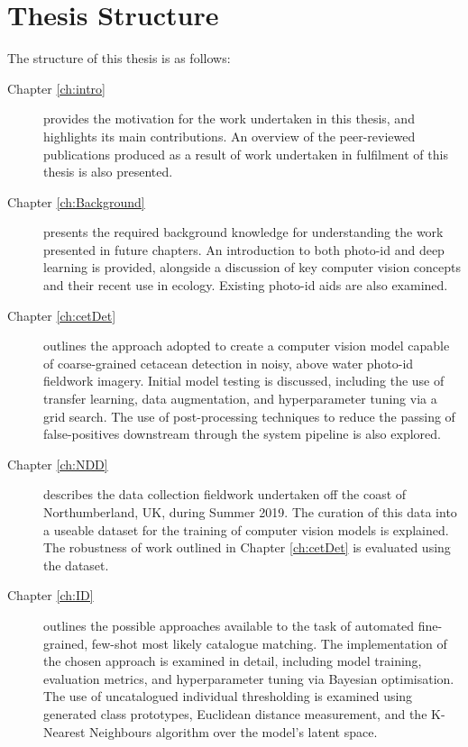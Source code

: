 \section{Thesis Structure}\label{ch:intro,sec:Structure}

The structure of this thesis is as follows:

\begin{description}
	\item[Chapter \ref{ch:intro}] provides the motivation for the work undertaken in this thesis, and highlights its main contributions. An overview of the peer-reviewed publications produced as a result of work undertaken in fulfilment of this thesis is also presented.
	
	\item[Chapter \ref{ch:Background}] presents the required background knowledge for understanding the work presented in future chapters. An introduction to both photo-id and deep learning is provided, alongside a discussion of key computer vision concepts and their recent use in ecology. Existing photo-id aids are also examined.
	
	\item[Chapter \ref{ch:cetDet}] outlines the approach adopted to create a computer vision model capable of coarse-grained cetacean detection in noisy, above water photo-id fieldwork imagery. Initial model testing is discussed, including the use of transfer learning, data augmentation, and hyperparameter tuning via a grid search. The use of post-processing techniques to reduce the passing of false-positives downstream through the system pipeline is also explored. 
	
	\item[Chapter \ref{ch:NDD}] describes the data collection fieldwork undertaken off the coast of Northumberland, UK, during Summer 2019. The curation of this data into a useable dataset for the training of computer vision models is explained. The robustness of work outlined in Chapter \ref{ch:cetDet} is evaluated using the dataset. 
	
	\item[Chapter \ref{ch:ID}] outlines the possible approaches available to the task of automated fine-grained, few-shot most likely catalogue matching. The implementation of the chosen approach is examined in detail, including model training, evaluation metrics, and hyperparameter tuning via Bayesian optimisation. The use of uncatalogued individual thresholding is examined using generated class prototypes, Euclidean distance measurement, and the K-Nearest Neighbours algorithm over the model's latent space. 
	

\end{description}
